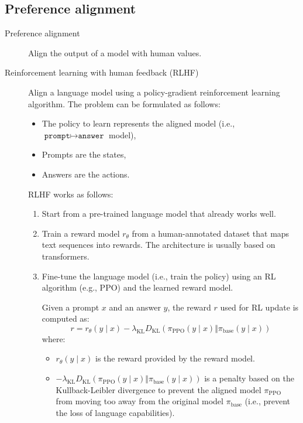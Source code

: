 \subsection{Preference alignment}

\begin{description}
    \item[Preference alignment] 
        Align the output of a model with human values.

    \item[Reinforcement learning with human feedback (RLHF)] 
        Align a language model using a policy-gradient reinforcement learning algorithm. The problem can be formulated as follows:
        \begin{itemize}
            \item The policy to learn represents the aligned model (i.e., $\texttt{prompt} \mapsto \texttt{answer}$ model),
            \item Prompts are the states,
            \item Answers are the actions.
        \end{itemize}
        RLHF works as follows:
        \begin{enumerate}
            \item Start from a pre-trained language model that already works well.

            \item Train a reward model $r_\theta$ from a human-annotated dataset that maps text sequences into rewards. The architecture is usually based on transformers.

            \item Fine-tune the language model (i.e., train the policy) using an RL algorithm (e.g., PPO) and the learned reward model. 

            Given a prompt $x$ and an answer $y$, the reward $r$ used for RL update is computed as:
            \[ r = r_\theta(y \mid x) - \lambda_\text{KL} D_\text{KL}(\pi_{\text{PPO}}(y \mid x) \Vert \pi_{\text{base}}(y \mid x)) \]
            where:
            \begin{itemize}
                \item $r_\theta(y \mid x)$ is the reward provided by the reward model.
                \item $- \lambda_\text{KL} D_\text{KL}(\pi_{\text{PPO}}(y \mid x) \Vert \pi_{\text{base}}(y \mid x))$ is a penalty based on the Kullback-Leibler divergence to prevent the aligned model $\pi_\text{PPO}$ from moving too away from the original model $\pi_\text{base}$ (i.e., prevent the loss of language capabilities).
            \end{itemize}
        \end{enumerate}


\end{description}
